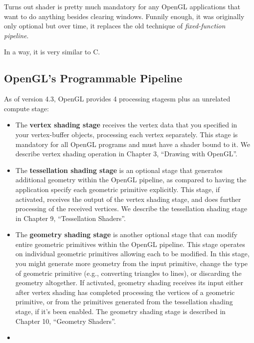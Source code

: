 \documentclass[a4paper, 12pt]{article}
\begin{document}
Turns out shader is pretty much mandatory for any OpenGL applications that want to do anything besides clearing windows.
Funnily enough, it was originally only optional but over time, it replaces the old technique of \textit{fixed-function pipeline}.

In a way, it is very similar to C.

\subsection{OpenGL's Programmable Pipeline}

As of version 4.3, OpenGL provides 4 processing stagesm plus an unrelated compute stage:

\begin{itemize}
      
      \item
            The \textbf{vertex shading stage} receives the vertex data that you specified in your vertex-buffer objects, processing each vertex separately.
            This stage is mandatory for all OpenGL programs and must have a shader bound to it.
            We describe vertex shading operation in Chapter 3, ``Drawing with OpenGL''.
      \item
            The \textbf{tessellation shading stage} is an optional stage that generates additional geometry within the OpenGL pipeline, as compared to having the application specify each geometric primitive explicitly.
            This stage, if activated, receives the output of the vertex shading stage, and does further processing of the received vertices.
            We describe the tessellation shading stage in Chapter 9, ``Tessellation Shaders''.
      \item
            The \textbf{geometry shading stage} is another optional stage that can modify entire geometric primitives within the OpenGL pipeline.
            This stage operates on individual geometric primitives allowing each to be modified.
            In this stage, you might generate more geometry from the input primitive, change the type of geometric primitive (e.g., converting triangles to lines), or discarding the geometry altogether.
            If activated, geometry shading receives its input either after vertex shading has completed processing the vertices of a geometric primitive, or from the primitives generated from the tessellation shading stage, if it's been enabled.
            The geometry shading stage is described in Chapter 10, ``Geometry Shaders''.
      \item

\end{itemize}
\end{document}
